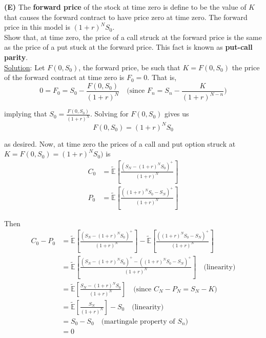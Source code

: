 \documentclass[12pt]{article}
\newlength\tindent
\renewcommand{\indent}{\hspace*{\tindent}}
\newcommand{\E}{\mathbb E}
\begin{document}
{\bf (E)} The {\bf forward price} of the stock at time zero is define to be the value of $K$ that causes the forward contract to have price zero at time zero. The forward price in this model is $(1 + r)^NS_0$. \\

\indent Show that, at time zero, the price of a call struck at the forward price is the same as the price of a put stuck at the forward price. This fact is known as {\bf put-call parity}. \\

\underline{Solution}: Let $F(0, S_0)$, the forward price, be such that $K = F(0, S_0)$ the price of the forward contract at time zero is $F_0 = 0$. That is,
\begin{equation*}
	0 = F_0 = S_0 - \frac{ F(0, S_0) }{ (1 + r)^N } \quad \text{(since } F_n = S_n - \frac{K}{(1 + r)^{N - n}})
\end{equation*}

implying that $S_0 = \frac{F(0, S_0)}{(1 + r)^N}$. Solving for $F(0, S_0)$ gives us
\begin{equation*}
	F(0, S_0) = (1 + r)^NS_0
\end{equation*}

as desired. Now, at time zero the prices of a call and put option struck at $K = F(0, S_0) = (1 + r)^NS_0)$ is
\begin{align*}
	C_0 &= \tilde{\E} \left[ \frac{ (S_N - (1 + r)^NS_0)^+ }{ (1 + r)^N } \right] \\
	P_0 &= \tilde{\E} \left[ \frac{ ((1 + r)^NS_0 - S_N)^+ }{ (1 + r)^N } \right]
\end{align*}

Then
\begin{align*}
	C_0 - P_0 &= \tilde{\E} \left[ \frac{ (S_N - (1 + r)^NS_0)^+ }{ (1 + r)^N } \right] - \tilde{\E} \left[ \frac{ ((1 + r)^NS_0 - S_N)^+ }{ (1 + r)^N } \right] \\
	&= \tilde{\E} \left[ \frac{ (S_N - (1 + r)^NS_0)^+ - ((1 + r)^NS_0 - S_N)^+ }{ (1 + r)^N } \right] \quad \text{(linearity)} \\
	&= \tilde{\E} \left[ \frac{ S_N - (1 + r)^NS_0 }{ (1 + r)^N } \right] \quad \text{(since } C_N - P_N = S_N - K) \\
	&= \tilde{\E} \left[ \frac{ S_N }{ (1 + r)^N } \right] - S_0 \quad \text{(linearity)} \\
	&= S_0 - S_0 \quad \text{(martingale property of $S_n$)} \\
	&= 0
\end{align*}
\end{document}
